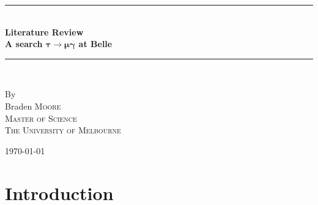 \documentclass[12pt,a4paper]{article} %
\begin{document}
\pagestyle{empty}

\newcommand{\HRule}{\rule{\linewidth}{0.5mm}}

\begin{titlepage}

    \begin{center}
        \vspace*{5cm}

        \HRule \\[0.75cm]
        \huge \textbf{Literature Review} \\[0.5cm]
		\Huge \textbf{A search $\bm{\tau\to\mu \gamma}$ at Belle}\\[0.5cm]
        \HRule \\[1.5cm]
        \begin{minipage}{0.4\textwidth}
        \begin{center}

        \large By \\[0.75cm]
        \huge Braden \scshape Moore \\[0.5cm]
        \normalsize \normalfont Master of Science \\
        The University of Melbourne \\

        \end{center}
        \end{minipage}

        \vfill

        \large \today
    \end{center}


\newpage
\end{titlepage}
\pagestyle{empty}
\tableofcontents
\newpage

\pagestyle{fancy}
\lfoot{\textsc{\today}}
\setcounter{page}{1}


\section{Introduction}
\end{document}

